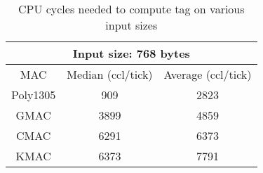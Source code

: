 \documentclass[journal=tches,submission]{iacrtrans}
\begin{document}
\begin{table}[h]
    \centering
    \small
    \caption{CPU cycles needed to compute tag on various input sizes}\label{tbl:mac-performance}
    \begin{tabular}{|c|c|c|}
        \hline
        \multicolumn{3}{|c|}{\bf Input size: 768 bytes} \\
        \hline
        MAC & Median (ccl/tick) & Average (ccl/tick)\\
        \hline
        Poly1305 & 909 & 2823 \\
        \hline
        GMAC & 3899 & 4859 \\
        \hline
        CMAC & 6291 & 6373 \\
        \hline
        KMAC & 6373 & 7791 \\
        \hline
    \end{tabular}
\end{table}
\end{document}
